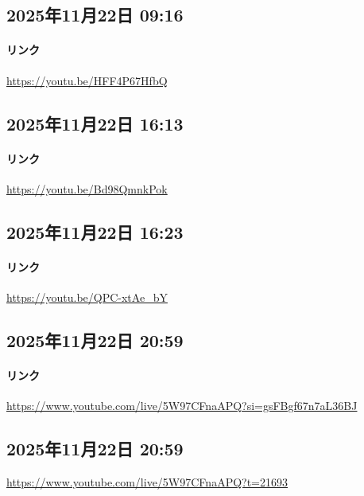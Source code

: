 \subsection*{2025年11月22日 09:16}

\paragraph{リンク}
\url{https://youtu.be/HFF4P67HfbQ}

\subsection*{2025年11月22日 16:13}

\paragraph{リンク}
\url{https://youtu.be/Bd98QmnkPok}

\subsection*{2025年11月22日 16:23}

\paragraph{リンク}
\url{https://youtu.be/QPC-xtAe_bY}

\subsection*{2025年11月22日 20:59}

\paragraph{リンク}
\url{https://www.youtube.com/live/5W97CFnaAPQ?si=gsFBgf67n7aL36BJ}

\subsection*{2025年11月22日 20:59}

\url{https://www.youtube.com/live/5W97CFnaAPQ?t=21693}

